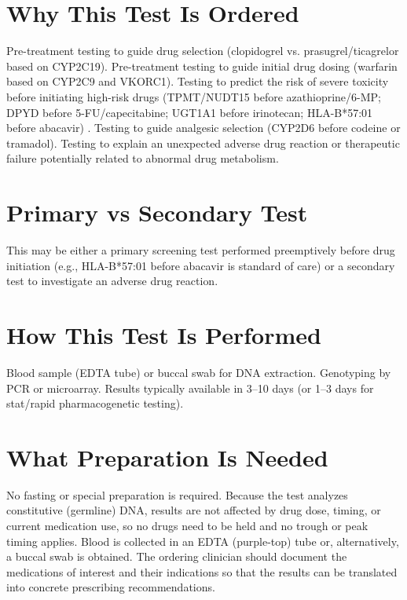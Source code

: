 \section*{Why This Test Is Ordered}
Pre-treatment testing to guide drug selection (clopidogrel vs. prasugrel/ticagrelor based on CYP2C19). Pre-treatment testing to guide initial drug dosing (warfarin based on CYP2C9 and VKORC1). Testing to predict the risk of severe toxicity before initiating high-risk drugs (TPMT/NUDT15 before azathioprine/6-MP; DPYD before 5-FU/capecitabine; UGT1A1 before irinotecan; HLA-B*57:01 before abacavir) \cite{deenen2016upfront}. Testing to guide analgesic selection (CYP2D6 before codeine or tramadol). Testing to explain an unexpected adverse drug reaction or therapeutic failure potentially related to abnormal drug metabolism.

\section*{Primary vs Secondary Test}
This may be either a primary screening test performed preemptively before drug initiation (e.g., HLA-B*57:01 before abacavir is standard of care) or a secondary test to investigate an adverse drug reaction.

\section*{How This Test Is Performed}
Blood sample (EDTA tube) or buccal swab for DNA extraction. Genotyping by PCR or microarray. Results typically available in 3--10 days (or 1--3 days for stat/rapid pharmacogenetic testing).

\section*{What Preparation Is Needed}
No fasting or special preparation is required. Because the test analyzes constitutive (germline) DNA, results are not affected by drug dose, timing, or current medication use, so no drugs need to be held and no trough or peak timing applies. Blood is collected in an EDTA (purple-top) tube or, alternatively, a buccal swab is obtained. The ordering clinician should document the medications of interest and their indications so that the results can be translated into concrete prescribing recommendations.

